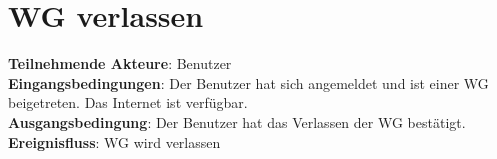\documentclass[a4paper]{scrreprt}
\begin{document}
		\section{WG verlassen}
		\textbf{Teilnehmende Akteure}: Benutzer \\
		\textbf{Eingangsbedingungen}: Der Benutzer hat sich angemeldet und ist einer WG beigetreten. Das Internet ist verfügbar. \\
		\textbf{Ausgangsbedingung}: Der Benutzer hat das Verlassen der WG bestätigt. \\
		\textbf{Ereignisfluss}: WG wird verlassen
\end{document}
